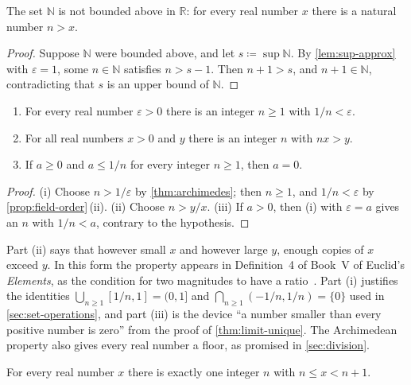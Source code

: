 \begin{theorem}
\label{thm:archimedes}
The set $\mathbb N$ is not bounded above in $\mathbb R$: for every real number $x$ there is a natural number $n>x$.
\end{theorem}

\begin{proof}
Suppose $\mathbb N$ were bounded above, and let $s\coloneqq\sup\mathbb N$. By \cref{lem:sup-approx} with $\varepsilon=1$, some $n\in\mathbb N$ satisfies $n>s-1$. Then $n+1>s$, and $n+1\in\mathbb N$, contradicting that $s$ is an upper bound of $\mathbb N$.
\end{proof}

\begin{corollary}
\label{cor:archimedes}
\leavevmode
\begin{enumerate}
\item For every real number $\varepsilon>0$ there is an integer $n\ge1$ with $1/n<\varepsilon$.
\item For all real numbers $x>0$ and $y$ there is an integer $n$ with $nx>y$.
\item If $a\ge0$ and $a\le1/n$ for every integer $n\ge1$, then $a=0$.
\end{enumerate}
\end{corollary}

\begin{proof}
(i) Choose $n>1/\varepsilon$ by \cref{thm:archimedes}; then $n\ge1$, and $1/n<\varepsilon$ by \cref{prop:field-order}\,(ii). (ii) Choose $n>y/x$. (iii) If $a>0$, then (i) with $\varepsilon=a$ gives an $n$ with $1/n<a$, contrary to the hypothesis.
\end{proof}

Part (ii) says that however small $x$ and however large $y$, enough copies of $x$ exceed $y$. In this form the property appears in Definition~4 of Book~V of Euclid's \emph{Elements}, as the condition for two magnitudes to have a ratio~\cite{heath1956euclid}. Part (i) justifies the identities $\bigcup_{n\ge1}[1/n,1]=(0,1]$ and $\bigcap_{n\ge1}(-1/n,1/n)=\{0\}$ used in \cref{sec:set-operations}, and part (iii) is the device ``a number smaller than every positive number is zero'' from the proof of \cref{thm:limit-unique}. The Archimedean property also gives every real number a floor, as promised in \cref{sec:division}.

\begin{theorem}
\label{thm:floor}
For every real number $x$ there is exactly one integer $n$ with $n\le x<n+1$.
\end{theorem}

